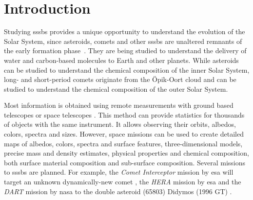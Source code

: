 \section{Introduction} \label{sec:introduction}




Studying \glspl{sssb} provides a unique opportunity to understand the evolution of the Solar System, since asteroids, comets and other \glspl{sssb} are unaltered remnants of the early formation phase~\cite{walsh2018rubble, a2017comets}. They are being studied to understand the delivery of water and carbon-based molecules to Earth and other planets. While asteroids can be studied to understand the chemical composition of the inner Solar System, long- and short-period comets originate from the \"Opik-Oort cloud and can be studied to understand the chemical composition of the outer Solar System.

Most information is obtained using remote measurements with ground based telescopes or space telescopes \cite{bowles2018castaway}. This method can provide statistics for thousands of objects with the same instrument. It allows observing their orbits, albedos, colors, spectra and sizes. However, space missions can be used to create detailed maps of albedos, colors, spectra and surface features, three-dimensional models, precise mass and density estimates, physical properties and chemical composition, both surface material composition and sub-surface composition. Several missions to \glspl{sssb} are planned. For example, the \textit{Comet Interceptor} mission by \gls{esa} will target an unknown dynamically-new comet \cite{snodgrass2019europeanCI}, the \textit{HERA} mission by \gls{esa} and the \textit{DART} mission by \gls{nasa} to the double asteroid (65803) Didymos (1996 GT) \cite{hera, talbert_2017DART}.

